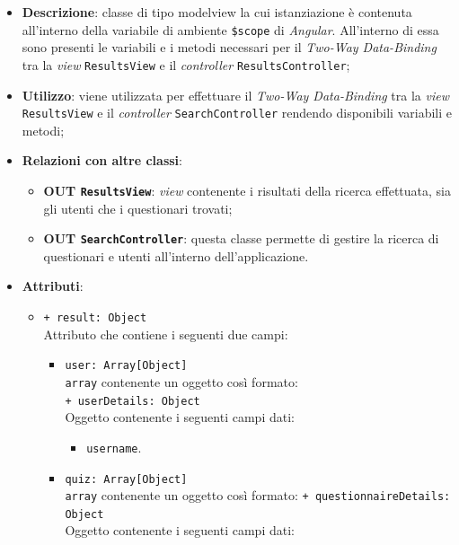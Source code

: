 	\begin{itemize}
		\item \textbf{Descrizione}: classe di tipo modelview la cui istanziazione è contenuta all'interno della variabile di ambiente \texttt{\$scope} di \textit{Angular}. All'interno di essa sono presenti le variabili e i metodi necessari per il \textit{Two-Way Data-Binding} tra la \textit{view} \texttt{ResultsView} e il \textit{controller} \texttt{ResultsController};
		\item \textbf{Utilizzo}: viene utilizzata per effettuare il \textit{Two-Way Data-Binding} tra la \textit{view}\\ \texttt{ResultsView} e il \textit{controller} \texttt{SearchController} rendendo disponibili variabili e metodi;
		\item \textbf{Relazioni con altre classi}: 
		\begin{itemize}
			\item \textbf{OUT \texttt{ResultsView}}: \textit{view} contenente i risultati della ricerca effettuata, sia gli utenti che i questionari trovati; 
			\item \textbf{OUT \texttt{SearchController}}: questa classe permette di gestire la ricerca di questionari e utenti all'interno dell'applicazione.
		\end{itemize}
		\item \textbf{Attributi}: 
		\begin{itemize}
			\item \texttt{+ result: Object} \\ Attributo che contiene i seguenti due campi: 
			\begin{itemize}
				\item \texttt{user: Array[Object]}\\ 
				\texttt{array} contenente un oggetto così formato:\\
				\texttt{+ userDetails: Object} \\ 
				Oggetto contenente i seguenti campi dati:
				\begin{itemize}
					\item \texttt{username}.
				\end{itemize}
				\item \texttt{quiz: Array[Object]}\\ 
				\texttt{array} contenente un oggetto così formato:
				\texttt{+ questionnaireDetails: Object} \\ 
				Oggetto contenente i seguenti campi dati:
				\begin{itemize}

\end{itemize}
\end{itemize}
\end{itemize}
\end{itemize}
